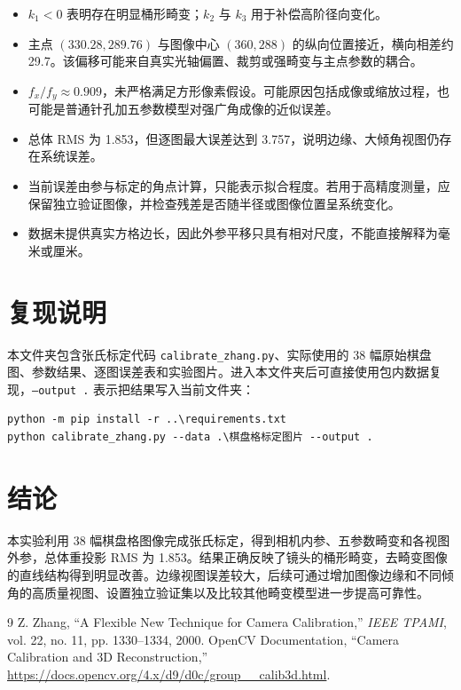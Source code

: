 \documentclass[UTF8,a4paper,12pt]{ctexart}
\begin{document}
\begin{itemize}
  \item $k_1<0$ 表明存在明显桶形畸变；$k_2$ 与 $k_3$ 用于补偿高阶径向变化。
  \item 主点 $(330.28,289.76)$ 与图像中心 $(360,288)$ 的纵向位置接近，横向相差约 \SI{29.7}{\pixel}。该偏移可能来自真实光轴偏置、裁剪或强畸变与主点参数的耦合。
  \item $f_x/f_y\approx0.909$，未严格满足方形像素假设。可能原因包括成像或缩放过程，也可能是普通针孔加五参数模型对强广角成像的近似误差。
  \item 总体 RMS 为 \SI{1.853}{\pixel}，但逐图最大误差达到 \SI{3.757}{\pixel}，说明边缘、大倾角视图仍存在系统误差。
  \item 当前误差由参与标定的角点计算，只能表示拟合程度。若用于高精度测量，应保留独立验证图像，并检查残差是否随半径或图像位置呈系统变化。
  \item 数据未提供真实方格边长，因此外参平移只具有相对尺度，不能直接解释为毫米或厘米。
\end{itemize}

\section{复现说明}

本文件夹包含张氏标定代码 \texttt{calibrate\_zhang.py}、实际使用的 38 幅原始棋盘图、参数结果、逐图误差表和实验图片。进入本文件夹后可直接使用包内数据复现，\texttt{--output .} 表示把结果写入当前文件夹：
\begin{verbatim}
python -m pip install -r ..\requirements.txt
python calibrate_zhang.py --data .\棋盘格标定图片 --output .
\end{verbatim}

\section{结论}

本实验利用 38 幅棋盘格图像完成张氏标定，得到相机内参、五参数畸变和各视图外参，总体重投影 RMS 为 \SI{1.853}{\pixel}。结果正确反映了镜头的桶形畸变，去畸变图像的直线结构得到明显改善。边缘视图误差较大，后续可通过增加图像边缘和不同倾角的高质量视图、设置独立验证集以及比较其他畸变模型进一步提高可靠性。

\begin{thebibliography}{9}
 Z. Zhang, ``A Flexible New Technique for Camera Calibration,'' \emph{IEEE TPAMI}, vol. 22, no. 11, pp. 1330--1334, 2000.
 OpenCV Documentation, ``Camera Calibration and 3D Reconstruction,'' \url{https://docs.opencv.org/4.x/d9/d0c/group__calib3d.html}.
\end{thebibliography}
\end{document}
